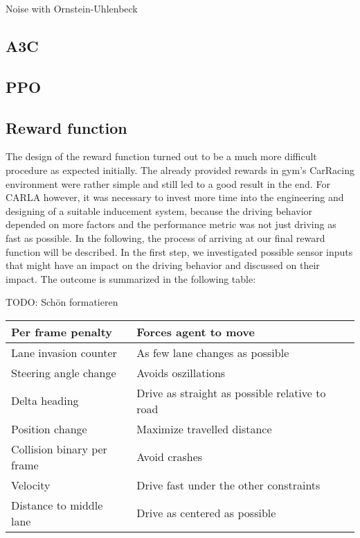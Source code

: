 \documentclass[letterpaper, 10 pt, conference]{ieeeconf}  %
\begin{document}
Noise with Ornstein-Uhlenbeck

\subsection{A3C}
\subsection{PPO}
\subsection{Reward function}
The design of the reward function turned out to be a much more difficult procedure as expected initially. The already provided rewards in gym's CarRacing environment were rather simple and still led to a good result in the end. For CARLA however, it was necessary to invest more time into the engineering and designing of a suitable inducement system, because the driving behavior depended on more factors and the performance metric was not just driving as fast as possible. In the following, the process of arriving at our final reward function will be described. \newline 
In the first step, we investigated possible sensor inputs that might have an impact on the driving behavior and discussed on their impact. The outcome is summarized in the following table:
\newline 

TODO: Schön formatieren
\begin{tabular}{ | l | l | l | p{5cm} |}
\hline
Per frame penalty & Forces agent to move \\
\hline
Lane invasion counter & As few lane changes as possible \\
\hline
Steering angle change & Avoids oszillations \\
\hline
Delta heading  & Drive as straight as possible relative to road \\
\hline
Position change & Maximize travelled distance \\
\hline
Collision binary per frame & Avoid crashes  \\
\hline
Velocity & Drive fast under the other constraints\\
\hline
Distance to middle lane & Drive as centered as possible\\
\hline
\end{tabular}
\newline
\end{document}

